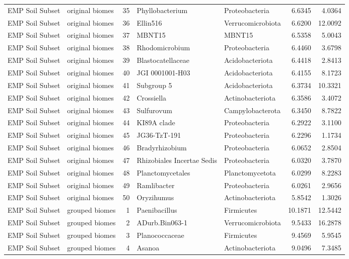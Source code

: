 \documentclass[12pt, oneside]{report}
\begin{document}
\begin{center}
\begin{longtable}{llrp{2.7cm}p{2.2cm}rr}
EMP Soil Subset & original biomes & 35 & Phyllobacterium & Proteobacteria & 6.6345 & 4.0364 \\
EMP Soil Subset & original biomes & 36 & Ellin516 & Verrucomicrobiota & 6.6200 & 12.0092 \\
EMP Soil Subset & original biomes & 37 & MBNT15 & MBNT15 & 6.5358 & 5.0043 \\
EMP Soil Subset & original biomes & 38 & Rhodomicrobium & Proteobacteria & 6.4460 & 3.6798 \\
EMP Soil Subset & original biomes & 39 & Blastocatellaceae & Acidobacteriota & 6.4418 & 2.8413 \\
EMP Soil Subset & original biomes & 40 & JGI 0001001-H03 & Acidobacteriota & 6.4155 & 8.1723 \\
EMP Soil Subset & original biomes & 41 & Subgroup 5 & Acidobacteriota & 6.3734 & 10.3321 \\
EMP Soil Subset & original biomes & 42 & Crossiella & Actinobacteriota & 6.3586 & 3.4072 \\
EMP Soil Subset & original biomes & 43 & Sulfurovum & Campylobacterota & 6.3450 & 8.7822 \\
EMP Soil Subset & original biomes & 44 & KI89A clade & Proteobacteria & 6.2922 & 3.1100 \\
EMP Soil Subset & original biomes & 45 & JG36-TzT-191 & Proteobacteria & 6.2296 & 1.1734 \\
EMP Soil Subset & original biomes & 46 & Bradyrhizobium & Proteobacteria & 6.0652 & 2.8504 \\
EMP Soil Subset & original biomes & 47 & Rhizobiales Incertae Sedis & Proteobacteria & 6.0320 & 3.7870 \\
EMP Soil Subset & original biomes & 48 & Planctomycetales & Planctomycetota & 6.0299 & 8.2283 \\
EMP Soil Subset & original biomes & 49 & Ramlibacter & Proteobacteria & 6.0261 & 2.9656 \\
EMP Soil Subset & original biomes & 50 & Oryzihumus & Actinobacteriota & 5.8542 & 1.3026 \\
EMP Soil Subset & grouped biomes & 1 & Paenibacillus & Firmicutes & 10.1871 & 12.5442 \\
EMP Soil Subset & grouped biomes & 2 & ADurb.Bin063-1 & Verrucomicrobiota & 9.5433 & 16.2878 \\
EMP Soil Subset & grouped biomes & 3 & Planococcaceae & Firmicutes & 9.4569 & 5.9545 \\
EMP Soil Subset & grouped biomes & 4 & Asanoa & Actinobacteriota & 9.0496 & 7.3485 \\

\end{longtable}
\end{center}
\end{document}
